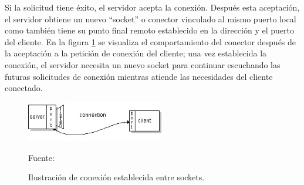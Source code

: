 Si la solicitud tiene éxito, el servidor acepta la conexión. Después esta aceptación, el servidor obtiene un nuevo ``socket'' o conector vinculado al mismo puerto local como también tiene su punto final remoto establecido en la dirección y el puerto del cliente. En la figura \ref{fig:socket_connection} se visualiza el comportamiento del conector después de la aceptación a la petición de conexión del cliente; una vez establecida la conexión, el servidor necesita un nuevo socket para continuar escuchando las futuras solicitudes de conexión mientras atiende las necesidades del cliente conectado.\\

\begin{figure}[H]
    \begin{center}
        \includegraphics[width=6cm]{img/capitulo_2/socket_connection.jpg}
    \end{center}
    \begin{center}
        \caption{Ilustración de conexión establecida entre sockets.}
        Fuente: \cite{socketconnection}
        \label{fig:socket_connection}
    \end{center}
\end{figure}



